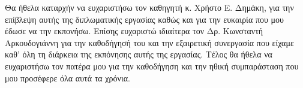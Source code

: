 \begin{acknowledgements}
Θα ήθελα καταρχήν να ευχαριστήσω τον καθηγητή κ. Χρήστο Ε. Δημάκη, για την επίβλεψη αυτής της διπλωματικής εργασίας καθώς και για την ευκαιρία που μου έδωσε να την εκπονήσω. Επίσης ευχαριστώ ιδιαίτερα τον Δρ. Κωνσταντή Αρκουδογιάννη για την καθοδήγησή του και την εξαιρετική συνεργασία που είχαμε καθ' όλη τη διάρκεια της εκπόνησης αυτής της εργασίας. Τέλος θα ήθελα να ευχαριστήσω τον πατέρα μου για την καθοδήγηση και την ηθική συμπαράσταση που μου προσέφερε όλα αυτά τα χρόνια.
\end{acknowledgements}